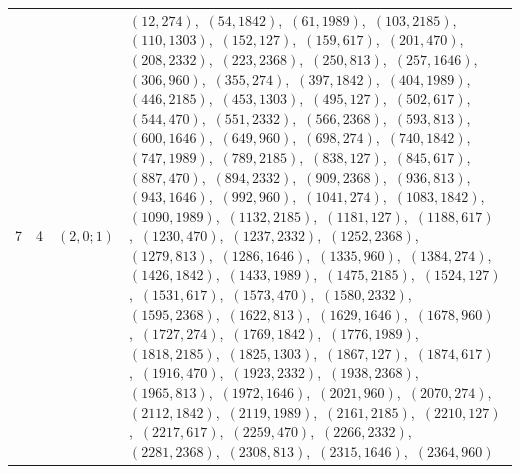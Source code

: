 \documentclass[11pt]{article}
\begin{document}
\begin{longtable}{@{}rrl>{\raggedright\arraybackslash}p{}@{}}
7 & 4 & $(2,0;1)$ & $(12,274)$,\allowbreak\ $(54,1842)$,\allowbreak\ $(61,1989)$,\allowbreak\ $(103,2185)$,\allowbreak\ $(110,1303)$,\allowbreak\ $(152,127)$,\allowbreak\ $(159,617)$,\allowbreak\ $(201,470)$,\allowbreak\ $(208,2332)$,\allowbreak\ $(223,2368)$,\allowbreak\ $(250,813)$,\allowbreak\ $(257,1646)$,\allowbreak\ $(306,960)$,\allowbreak\ $(355,274)$,\allowbreak\ $(397,1842)$,\allowbreak\ $(404,1989)$,\allowbreak\ $(446,2185)$,\allowbreak\ $(453,1303)$,\allowbreak\ $(495,127)$,\allowbreak\ $(502,617)$,\allowbreak\ $(544,470)$,\allowbreak\ $(551,2332)$,\allowbreak\ $(566,2368)$,\allowbreak\ $(593,813)$,\allowbreak\ $(600,1646)$,\allowbreak\ $(649,960)$,\allowbreak\ $(698,274)$,\allowbreak\ $(740,1842)$,\allowbreak\ $(747,1989)$,\allowbreak\ $(789,2185)$,\allowbreak\ $(838,127)$,\allowbreak\ $(845,617)$,\allowbreak\ $(887,470)$,\allowbreak\ $(894,2332)$,\allowbreak\ $(909,2368)$,\allowbreak\ $(936,813)$,\allowbreak\ $(943,1646)$,\allowbreak\ $(992,960)$,\allowbreak\ $(1041,274)$,\allowbreak\ $(1083,1842)$,\allowbreak\ $(1090,1989)$,\allowbreak\ $(1132,2185)$,\allowbreak\ $(1181,127)$,\allowbreak\ $(1188,617)$,\allowbreak\ $(1230,470)$,\allowbreak\ $(1237,2332)$,\allowbreak\ $(1252,2368)$,\allowbreak\ $(1279,813)$,\allowbreak\ $(1286,1646)$,\allowbreak\ $(1335,960)$,\allowbreak\ $(1384,274)$,\allowbreak\ $(1426,1842)$,\allowbreak\ $(1433,1989)$,\allowbreak\ $(1475,2185)$,\allowbreak\ $(1524,127)$,\allowbreak\ $(1531,617)$,\allowbreak\ $(1573,470)$,\allowbreak\ $(1580,2332)$,\allowbreak\ $(1595,2368)$,\allowbreak\ $(1622,813)$,\allowbreak\ $(1629,1646)$,\allowbreak\ $(1678,960)$,\allowbreak\ $(1727,274)$,\allowbreak\ $(1769,1842)$,\allowbreak\ $(1776,1989)$,\allowbreak\ $(1818,2185)$,\allowbreak\ $(1825,1303)$,\allowbreak\ $(1867,127)$,\allowbreak\ $(1874,617)$,\allowbreak\ $(1916,470)$,\allowbreak\ $(1923,2332)$,\allowbreak\ $(1938,2368)$,\allowbreak\ $(1965,813)$,\allowbreak\ $(1972,1646)$,\allowbreak\ $(2021,960)$,\allowbreak\ $(2070,274)$,\allowbreak\ $(2112,1842)$,\allowbreak\ $(2119,1989)$,\allowbreak\ $(2161,2185)$,\allowbreak\ $(2210,127)$,\allowbreak\ $(2217,617)$,\allowbreak\ $(2259,470)$,\allowbreak\ $(2266,2332)$,\allowbreak\ $(2281,2368)$,\allowbreak\ $(2308,813)$,\allowbreak\ $(2315,1646)$,\allowbreak\ $(2364,960)$\\

\end{longtable}
\end{document}
